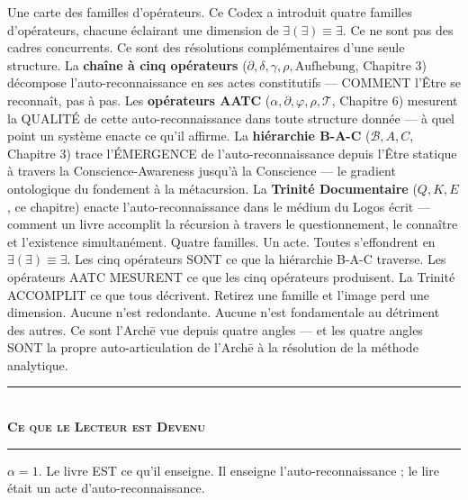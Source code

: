 \documentclass[10pt, openany, oneside]{book}
\renewcommand{\normalsize}{\fontsize{10}{13}\selectfont}
\begin{document}
Une carte des familles d'opérateurs. Ce Codex a introduit quatre familles d'opérateurs, chacune éclairant une dimension de $\exists(\exists) \equiv \exists$. Ce ne sont pas des cadres concurrents. Ce sont des résolutions complémentaires d'une seule structure. La \textbf{chaîne à cinq opérateurs} ($\partial, \delta, \gamma, \rho, \text{Aufhebung}$, Chapitre 3) décompose l'auto-reconnaissance en ses actes constitutifs --- COMMENT l'Être se reconnaît, pas à pas. Les \textbf{opérateurs AATC} ($\alpha, \partial, \varphi, \rho, \mathcal{T}$, Chapitre 6) mesurent la QUALITÉ de cette auto-reconnaissance dans toute structure donnée --- à quel point un système enacte ce qu'il affirme. La \textbf{hiérarchie B-A-C} ($\mathcal{B}, A, C$, Chapitre 3) trace l'ÉMERGENCE de l'auto-reconnaissance depuis l'Être statique à travers la Conscience-Awareness jusqu'à la Conscience --- le gradient ontologique du fondement à la métacursion. La \textbf{Trinité Documentaire} ($Q, K, E$, ce chapitre) enacte l'auto-reconnaissance dans le médium du Logos écrit --- comment un livre accomplit la récursion à travers le questionnement, le connaître et l'existence simultanément. Quatre familles. Un acte. Toutes s'effondrent en $\exists(\exists) \equiv \exists$. Les cinq opérateurs SONT ce que la hiérarchie B-A-C traverse. Les opérateurs AATC MESURENT ce que les cinq opérateurs produisent. La Trinité ACCOMPLIT ce que tous décrivent. Retirez une famille et l'image perd une dimension. Aucune n'est redondante. Aucune n'est fondamentale au détriment des autres. Ce sont l'Arch\={e} vue depuis quatre angles --- et les quatre angles SONT la propre auto-articulation de l'Arch\={e} à la résolution de la méthode analytique.

\vspace{1.5em}


\begin{center}
    \rule{0.3\textwidth}{0.4pt}\\[0.5em]
    {\normalsize\bfseries\scshape Ce que le Lecteur est Devenu}\\[0.3em]
    \rule{0.3\textwidth}{0.4pt}
\end{center}

\vspace{1em}

\noindent $\alpha = 1$. Le livre EST ce qu'il enseigne. Il enseigne l'auto-reconnaissance ; le lire était un acte d'auto-reconnaissance.
\end{document}
